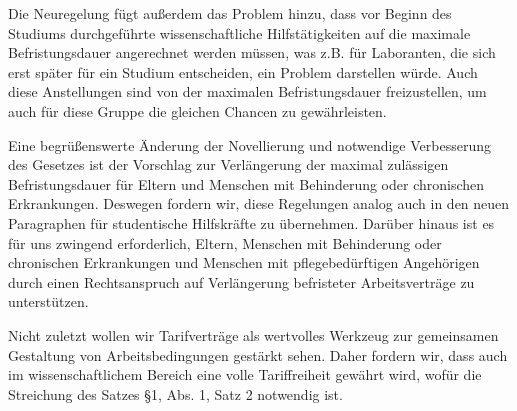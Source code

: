 Die Neuregelung fügt außerdem das Problem hinzu, dass vor Beginn des Studiums
durchgeführte wissenschaftliche Hilfstätigkeiten auf die maximale
Befristungsdauer angerechnet werden müssen, was z.B. für Laboranten, die sich
erst später für ein Studium entscheiden, ein Problem darstellen würde.
Auch diese Anstellungen sind von der maximalen Befristungsdauer freizustellen,
um auch für diese Gruppe die gleichen Chancen zu gewährleisten.

Eine begrüßenswerte Änderung der Novellierung und notwendige Verbesserung des
Gesetzes ist der Vorschlag zur Verlängerung der maximal zulässigen
Befristungsdauer für Eltern und Menschen mit Behinderung oder chronischen
Erkrankungen. Deswegen fordern wir, diese Regelungen analog auch in den neuen
Paragraphen für studentische Hilfskräfte zu übernehmen. Darüber hinaus ist es
für uns zwingend erforderlich, Eltern, Menschen mit Behinderung oder
chronischen Erkrankungen und Menschen mit pflegebedürftigen Angehörigen durch
einen Rechtsanspruch auf Verlängerung befristeter Arbeitsverträge zu
unterstützen.

Nicht zuletzt wollen wir Tarifverträge als wertvolles Werkzeug zur gemeinsamen
Gestaltung von Arbeitsbedingungen gestärkt sehen. Daher fordern wir, dass auch
im wissenschaftlichem Bereich eine volle Tariffreiheit gewährt wird, wofür die
Streichung des Satzes §1, Abs. 1, Satz 2 notwendig ist.
